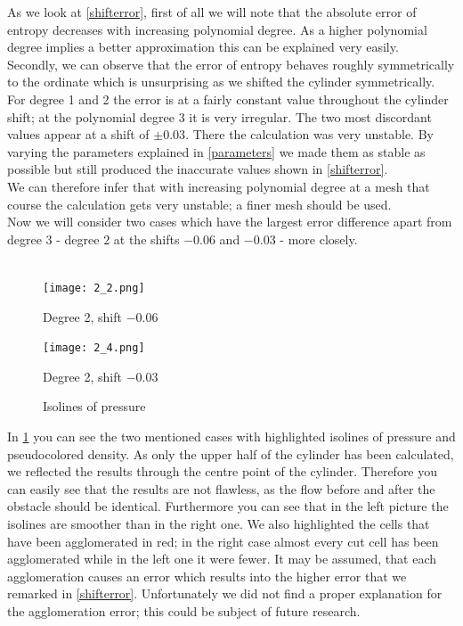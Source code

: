 	As we look at \cref{shifterror}, first of all we will note that the absolute error of entropy decreases with increasing polynomial degree. As a higher polynomial degree implies a better approximation this can be explained very easily. \\ \indent
	Secondly, we can observe that the error of entropy behaves roughly symmetrically to the ordinate which is unsurprising as we shifted the cylinder symmetrically.\\ \indent
	For degree 1 and 2 the error is at a fairly constant value throughout the cylinder shift; at the polynomial degree 3 it is very irregular. The two most discordant values appear at a shift of $\pm 0.03$. There the calculation was very unstable. By varying the parameters explained in \cref{parameters} we made them as stable as possible but still produced the inaccurate values shown in \cref{shifterror}. \\ \indent
	We can therefore infer that with increasing polynomial degree at a mesh that course the calculation gets very unstable; a finer mesh should be used. \\ \indent
	Now we will consider two cases which have the largest error difference apart from degree 3 - degree $2$ at the shifts $-0.06$ and $-0.03$ - more closely. \\\\
	
	\begin{figure}[htp]
		\centering
		\begin{minipage}[b]{0.5\textwidth}
			\centering
			\texttt{[image: 2\_2.png]}
			\caption*{Degree 2, shift $-0.06$}
			\label{fig:2_2}
		\end{minipage}%
		\begin{minipage}[b]{0.5\textwidth}
			\centering
			\texttt{[image: 2\_4.png]}
			\caption*{Degree 2, shift $-0.03$}
			\label{fig:2_4}
		\end{minipage}
		\caption{Isolines of pressure}\label{fig:isoshift}
	\end{figure}
	
	In \cref{fig:isoshift} you can see the two mentioned cases with highlighted isolines of pressure and pseudocolored density. As only the upper half of the cylinder has been calculated, we reflected the results through the centre point of the cylinder. Therefore you can easily see that the results are not flawless, as the flow before and after the obstacle should be identical. Furthermore you can see that in the left picture the isolines are smoother than in the right one. We also highlighted the cells that have been agglomerated in red; in the right case almost every cut cell has been agglomerated while in the left one it were fewer. It may be assumed, that each agglomeration causes an error which results into the higher error that we remarked in \cref{shifterror}. Unfortunately we did not find a proper explanation for the agglomeration error; this could be subject of future research. \\\\ 
	
